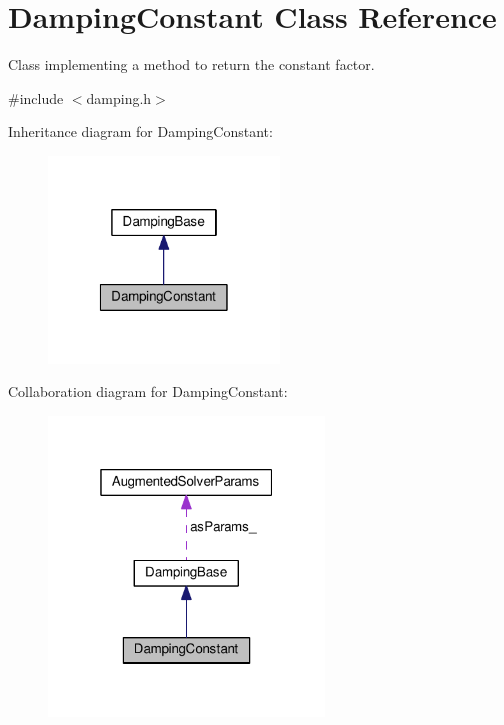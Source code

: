 \hypertarget{classDampingConstant}{\section{Damping\-Constant Class Reference}
\label{classDampingConstant}
}


Class implementing a method to return the constant factor.  




{\ttfamily \#include $<$damping.\-h$>$}



Inheritance diagram for Damping\-Constant\-:
\nopagebreak
\begin{figure}[H]
\begin{center}
\leavevmode
\includegraphics[width=174pt]{classDampingConstant__inherit__graph}
\end{center}
\end{figure}


Collaboration diagram for Damping\-Constant\-:
\nopagebreak
\begin{figure}[H]
\begin{center}
\leavevmode
\includegraphics[width=208pt]{classDampingConstant__coll__graph}
\end{center}
\end{figure}
